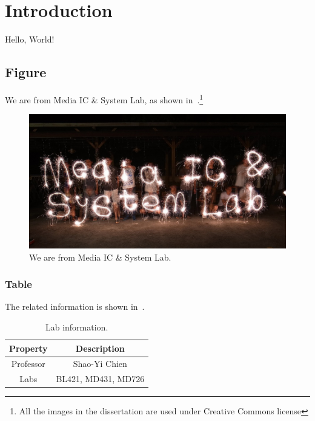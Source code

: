 \chapter{Introduction}
\label{ch:intro}
Hello, World!

\section{Figure}
\label{sec:figure}
We are from Media IC \& System Lab, as shown in~.\footnote{All the images in the dissertation are used under Creative Commons license}


\begin{figure}
\begin{center}
\includegraphics[width=0.8\linewidth]{body/1_introduction/figure/misl.jpg}
\end{center}
\caption{
We are from Media IC \& System Lab.
}
\label{fig:misl}
\end{figure}


\subsection{Table}
\label{sec:picture}
The related information is shown in~.

\begin{table}[p]
\horgap{4.5pt}
\caption{Lab information.}
\vspace{5pt}
\label{tab:lab_information}
\centering
\footnotesize 
\begin{tabular}{cc}
\toprule
Property & Description \\
\midrule
Professor & Shao-Yi Chien \\
Labs & BL421, MD431, MD726 \\
\bottomrule
\end{tabular}
\end{table}
